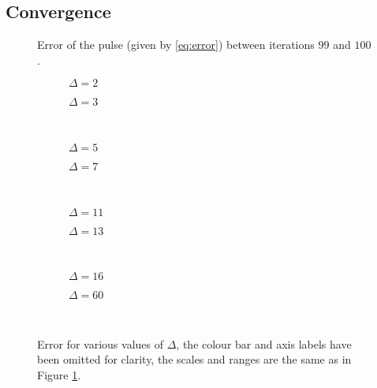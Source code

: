 \subsection{Convergence}
\begin{figure}[tbp]

\caption[Error of the pulse envelope.]{Error of the pulse (given by \eqref{eq:error}) between iterations $99$ and $100$.}
\label{fig:error}
\end{figure}

\begin{figure}[p]
\begin{subfigure}{0.5\textwidth}

\caption{$\Delta = 2$}
\end{subfigure}
\begin{subfigure}{0.5\textwidth}

\caption{$\Delta = 3$}
\end{subfigure} \\
\begin{subfigure}{0.5\textwidth}

\caption{$\Delta = 5$}
\end{subfigure}
\begin{subfigure}{0.5\textwidth}

\caption{$\Delta = 7$}
\end{subfigure} \\
\begin{subfigure}{0.5\textwidth}

\caption{$\Delta = 11$}
\end{subfigure}
\begin{subfigure}{0.5\textwidth}

\caption{$\Delta = 13$}
\end{subfigure} \\
\begin{subfigure}{0.5\textwidth}

\caption{$\Delta = 16$}
\end{subfigure}
\begin{subfigure}{0.5\textwidth}

\caption{$\Delta = 60$}
\end{subfigure} \\
\caption[Error for various step sizes.]{Error for various values of $\Delta$, the colour bar and axis labels have been omitted for clarity, the scales and ranges are the same as in Figure \ref{fig:error}.}
\label{fig:deltaerror}
\end{figure}

